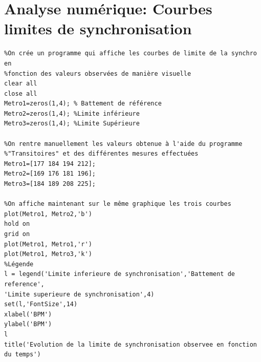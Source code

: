 \documentclass[a4paper,11pt]{report}
\begin{document}
\chapter{Analyse numérique: Courbes limites de synchronisation}
\label{Limite}
\begin{verbatim}
%On crée un programme qui affiche les courbes de limite de la synchro en
%fonction des valeurs observées de manière visuelle
clear all
close all
Metro1=zeros(1,4); % Battement de référence
Metro2=zeros(1,4); %Limite inférieure
Metro3=zeros(1,4); %Limite Supérieure

%On rentre manuellement les valeurs obtenue à l'aide du programme
%"Transitoires" et des différentes mesures effectuées
Metro1=[177 184 194 212];
Metro2=[169 176 181 196];
Metro3=[184 189 208 225];

%On affiche maintenant sur le même graphique les trois courbes
plot(Metro1, Metro2,'b')
hold on
grid on
plot(Metro1, Metro1,'r')
plot(Metro1, Metro3,'k')
%Légende
l = legend('Limite inferieure de synchronisation','Battement de reference',
'Limite superieure de synchronisation',4)
set(l,'FontSize',14)
xlabel('BPM')
ylabel('BPM')
l
title('Evolution de la limite de synchronisation observee en fonction du temps')
\end{verbatim}
\end{document}
